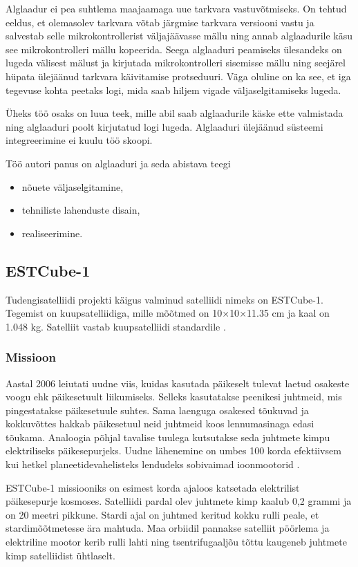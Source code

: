 \documentclass[12pt,a4paper]{article}
\begin{document}
Alglaadur ei pea suhtlema maajaamaga uue tarkvara vastuvõtmiseks. On tehtud
eeldus, et olemasolev tarkvara võtab järgmise tarkvara versiooni vastu ja
salvestab selle mikrokontrollerist väljajäävasse mällu ning annab alglaadurile
käsu see mikrokontrolleri mällu kopeerida. Seega alglaaduri peamiseks ülesandeks
on lugeda välisest mälust ja kirjutada mikrokontrolleri sisemisse mällu ning
seejärel hüpata ülejäänud tarkvara käivitamise protseduuri. Väga oluline on ka
see, et iga tegevuse kohta peetaks logi, mida saab hiljem vigade
väljaselgitamiseks lugeda.

Üheks töö osaks on luua teek, mille abil saab alglaadurile käske ette valmistada
ning alglaaduri poolt kirjutatud logi lugeda. Alglaaduri ülejäänud süsteemi
integreerimine ei kuulu töö skoopi.

Töö autori panus on alglaaduri ja seda abistava teegi
\begin{itemize}
	\item nõuete väljaselgitamine,
	\item tehniliste lahenduste disain,
	\item realiseerimine.
\end{itemize}

\subsection{ESTCube-1}
Tudengisatelliidi projekti käigus valminud satelliidi nimeks on ESTCube-1.
Tegemist on kuupsatelliidiga, mille mõõtmed on 10\(\times\)10\(\times\)11.35 cm
ja kaal on 1.048 kg. Satelliit vastab kuupsatelliidi standardile \cite{cubesat}.

\subsubsection{Missioon}
Aastal 2006 leiutati uudne viis, kuidas kasutada päikeselt tulevat laetud
osakeste voogu ehk päikesetuult liikumiseks. Selleks kasutatakse peenikesi
juhtmeid, mis pingestatakse päikesetuule suhtes. Sama laenguga osakesed tõukuvad
ja kokkuvõttes hakkab päikesetuul neid juhtmeid koos lennumasinaga edasi
tõukama. Analoogia põhjal tavalise tuulega kutsutakse seda juhtmete kimpu
elektriliseks päikesepurjeks. Uudne lähenemine on umbes 100 korda efektiivsem
kui hetkel planeetidevahelisteks lendudeks sobivaimad ioonmootorid
\cite{errpuri}.

ESTCube-1 missiooniks on esimest korda ajaloos katsetada elektrilist
päikesepurje kosmoses. Satelliidi pardal olev juhtmete kimp kaalub 0,2 grammi ja
on 20 meetri pikkune. Stardi ajal on juhtmed keritud kokku rulli peale, et
stardimõõtmetesse ära mahtuda. Maa orbiidil pannakse satelliit pöörlema ja
elektriline mootor kerib rulli lahti ning tsentrifugaaljõu tõttu kaugeneb
juhtmete kimp satelliidist ühtlaselt.
\end{document}
